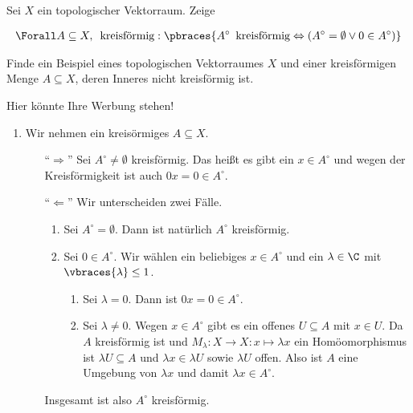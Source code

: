 \begin{exercise}

Sei $X$ ein topologischer Vektorraum.
Zeige

\begin{align*}
  \Forall A \subseteq X, \enspace \text{kreisförmig}:
  \pbraces
  {
    A^\circ \enspace \text{kreisförmig}
    \Leftrightarrow
    (A^\circ = \emptyset \lor 0 \in A^\circ)
  }
\end{align*}

Finde ein Beispiel eines topologischen Vektorraumes $X$ und einer kreisförmigen Menge $A \subseteq X$, deren
Inneres nicht kreisförmig ist.

\end{exercise}

\begin{solution}
Hier könnte Ihre Werbung stehen!
\begin{enumerate}[label = (\roman*)]
  \item Wir nehmen ein kreisörmiges $A \subseteq X$.
  \begin{enumerate}
    \item[``$\Rightarrow$''] Sei $A^\circ \neq \emptyset$ kreisförmig. Das heißt es gibt ein $x \in A^\circ$ und wegen der Kreisförmigkeit ist auch $0x = 0 \in A^\circ$.
    \item[``$\Leftarrow$'']  Wir unterscheiden zwei Fälle.
    \begin{enumerate}[label = Fall \arabic*:]
      \item Sei $A^\circ = \emptyset$. Dann ist natürlich $A^\circ$ kreisförmig.
      \item Sei $0 \in A^\circ$. Wir wählen ein beliebiges $x \in A^\circ$ und ein $\lambda \in \C$ mit $\vbraces{\lambda} \leq 1$.
      \begin{enumerate}[label = Fall 2.\arabic*:]
        \item Sei $\lambda = 0$. Dann ist $0x = 0 \in A^\circ$.
        \item Sei $\lambda \neq 0$. Wegen $x \in A^\circ$ gibt es ein offenes $U \subseteq A$ mit $x \in U$. Da $A$ kreisförmig ist und $M_\lambda: X \to X : x \mapsto \lambda x$ ein Homöomorphismus ist $\lambda U \subseteq A$ und $\lambda x \in \lambda U$ sowie $\lambda U$ offen. Also ist $A$ eine Umgebung von $\lambda x$ und damit $\lambda x \in A^\circ$.
      \end{enumerate}
    \end{enumerate}
    Insgesamt ist also $A^\circ$ kreisförmig.
  \end{enumerate}

\end{enumerate}
\end{solution}
